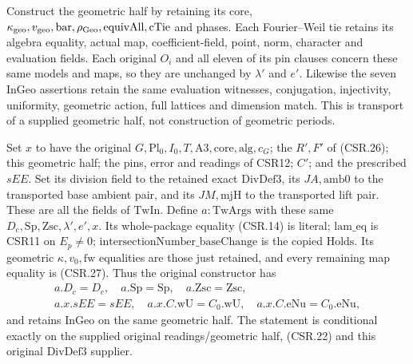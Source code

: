Construct the geometric half by retaining its core,
\(\kappa_{\rm geo},v_{\rm geo},\mathrm{bar},\rho_{\rm Geo},
\mathrm{equivAll},\mathrm{cTie}\) and phases. Each
Fourier--Weil tie retains its algebra equality, actual map,
coefficient-field, point, norm, character and evaluation fields.
Each original \(O_i\) and all eleven of its pin clauses concern
these same models and maps, so they are unchanged by \(\lambda'\)
and \(e'\). Likewise the seven \(\mathrm{InGeo}\) assertions
retain the same evaluation witnesses, conjugation, injectivity,
uniformity, geometric action, full lattices and dimension match.
This is transport of a supplied geometric half, not construction
of geometric periods.

Set \(x\) to have the original
\(G,\mathrm{Pl}_0,I_0,T,\mathrm{A3},\mathrm{core},\mathrm{alg},c_G\);
the \(R',F'\) of (CSR.26); this geometric half; the pins,
error and readings of CSR12; \(C'\); and the prescribed \(sEE\).
Set its division field to the retained exact \(\mathrm{DivDef3}\),
its \(JA,\mathrm{amb0}\) to the transported base ambient pair,
and its \(JM,\mathrm{mjH}\) to the transported lift pair.
These are all the fields of \(\mathrm{TwIn}\).
Define \(a:\mathrm{TwArgs}\) with these same
\(D_c,\mathrm{Sp},\mathrm{Zsc},\lambda',e',x\).
Its whole-package equality (CSR.14) is literal;
\(\mathrm{lam\_eq}\) is CSR11 on \(E_p\ne0\);
\(\mathrm{intersectionNumber\_baseChange}\) is the copied
\(\mathrm{Holds}\). Its geometric \(\kappa,v_0,\mathrm{fw}\)
equalities are those just retained, and every remaining map
equality is (CSR.27).
Thus the original constructor has
\[
 \begin{gathered}
 a.D_c=D_c,\quad a.\mathrm{Sp}=\mathrm{Sp},\quad
 a.\mathrm{Zsc}=\mathrm{Zsc},\\
 a.x.sEE=sEE,\quad
 a.x.C.\mathrm{wU}=C_0.\mathrm{wU},\quad
 a.x.C.\mathrm{eNu}=C_0.\mathrm{eNu},
 \end{gathered}
 \tag{CSR.28}
\]
and retains \(\mathrm{InGeo}\) on the same geometric half.
The statement is conditional exactly on the supplied original
readings/geometric half, (CSR.22) and this original
\(\mathrm{DivDef3}\) supplier.

